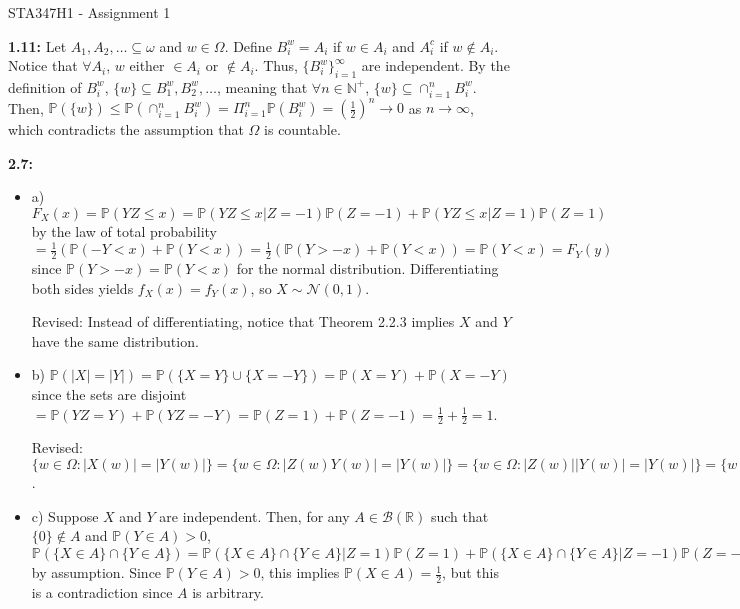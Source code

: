 \documentclass[12pt]{article}
\newcommand{\p}{\mathbb{P}}
\begin{document}
\begin{center}
{\Large STA347H1 - Assignment 1}
\end{center}

\textbf{1.11:} Let $A_1, A_2, \ldots \subseteq \omega$ and $w \in \Omega$. Define $B_i^w = A_i$ if $w \in A_i$ and $A_i^c$ if $w \notin A_i$. Notice that $\forall A_i$, $w$ either $\in A_i$ or $\notin A_i$. Thus, $\{B_i^w\}_{i=1}^\infty$ are independent. By the definition of $B_i^w$, $\{w\} \subseteq B_1^w, B_2^w, \ldots$, meaning that $\forall n \in \mathbb{N}^+$, $\{w\} \subseteq \cap_{i=1}^n B_i^w$. Then, $\p(\{w\}) \leq \p(\cap_{i=1}^n B_i^w) = \Pi_{i=1}^n \p(B_i^w) = (\frac{1}{2})^n \to 0$ as $n \to \infty$, which contradicts the assumption that $\Omega$ is countable.

\textbf{2.7:}
\begin{itemize}
    \item a) $F_X(x) = \p(YZ \leq x) = \p(YZ \leq x|Z = -1)\p(Z = -1) + \p(YZ \leq x|Z = 1)\p(Z = 1)$ by the law of total probability $= \frac{1}{2}(\p(-Y < x) + \p(Y < x)) = \frac{1}{2}(\p(Y > -x) + \p(Y < x)) = \p(Y < x) = F_Y(y)$ since $\p(Y > -x) = \p(Y < x)$ for the normal distribution. Differentiating both sides yields $f_X(x) = f_Y(x)$, so $X \sim \mathcal{N}(0, 1)$.

    Revised: Instead of differentiating, notice that Theorem 2.2.3 implies $X$ and $Y$ have the same distribution.
    \item b) $\p(|X| = |Y|) = \p(\{X = Y\} \cup \{X = -Y\}) = \p(X = Y) + \p(X = -Y)$ since the sets are disjoint $= \p(YZ = Y) + \p(YZ = -Y) = \p(Z = 1) + \p(Z = -1) = \frac{1}{2} + \frac{1}{2} = 1$.
    
    Revised: $\{w \in \Omega: |X(w)| = |Y(w)|\} = \{w \in \Omega: |Z(w)Y(w)| = |Y(w)|\} = \{w \in \Omega: |Z(w)||Y(w)| = |Y(w)|\} = \{w \in \Omega: |Y(w)| = |Y(w)|\} = \Omega \implies \p(|X| = |Y|) = 1$.
    \item c) Suppose $X$ and $Y$ are independent. Then, for any $A \in \mathcal{B}(\mathbb{R})$ such that $\{0\} \notin A$ and $\p(Y \in A) > 0$, $\p(\{X \in A\} \cap \{Y \in A\}) = \p(\{X \in A\} \cap \{Y \in A\}|Z = 1)\p(Z = 1) + \p(\{X \in A\} \cap \{Y \in A\}|Z = -1)\p(Z = -1) = \frac{1}{2} \p(\{Y \in A\} \cap \{Y \in A\}) + \frac{1}{2} \p(\{-Y \in A\} \cap \{Y \in A\}) = \frac{1}{2} \p(Y \in A) + \frac{1}{2}\p(\varnothing) = \frac{1}{2} \p(Y \in A) = \p(X \in A)\p(Y \in A)$ by assumption. Since $\p(Y \in A) > 0$, this implies $\p(X \in A) = \frac{1}{2}$, but this is a contradiction since $A$ is arbitrary.
\end{itemize}
\end{document}
